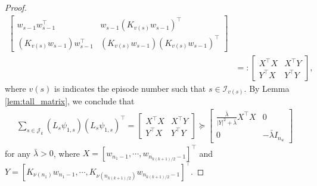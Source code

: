 \documentclass[11pt]{article}
\theoremstyle{plain}
\theoremstyle{definition}
\theoremstyle{remark}
\begin{document}
\begin{proof}
\begin{align*}
\begin{bmatrix}
        w_{s-1} w_{s-1}^{\top} & w_{s-1}(K_{v(s)}w_{s-1})^{\top}\\
        (K_{v(s)}w_{s-1}) w_{s-1}^{\top} & (K_{v(s)}w_{s-1})(K_{v(s)}w_{s-1})^{\top}     
    \end{bmatrix}
    \\
    & =: 
    \begin{bmatrix}
        X^{\top}X & X^{\top}Y\\
        Y^{\top}X & Y^{\top}Y
    \end{bmatrix},
\end{align*}
where $v(s)$ is indicates the episode number such that $s \in \mathcal{I}_{v(s)}$. By Lemma \ref{lem:tall_matrix}, we conclude that
\begin{align}\label{bar-lambda}
    \sum_{s \in\mathcal{J}_k}  (L_s\psi_{1,s})(L_s\psi_{1,s})^{\top} 
     = 
    \begin{bmatrix}
        X^{\top}X & X^{\top}Y\\
        Y^{\top}X & Y^{\top}Y
    \end{bmatrix}
     \succeq 
    \begin{bmatrix}
        \frac{\bar\lambda}{|Y|^2+\bar\lambda}X^{\top}X & 0\\
        0 & -\bar\lambda I_{n_u}
    \end{bmatrix}
\end{align}
for any $\bar\lambda>0$, where $X = [w_{n_1-1}, \cdots, w_{n_{k(k+1)/2}-1}]^{\top}$ and $Y = [K_{\nu(n_1)}w_{n_1-1}, \cdots, K_{\nu(n_{k(k+1)/2})}w_{n_{k(k+1)/2}-1}]^{\top}$.


\end{proof}
\end{document}
